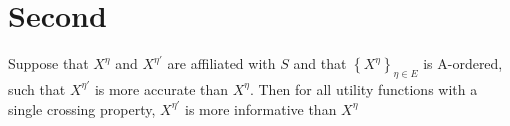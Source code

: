 \documentclass[a4paper]{article}
\begin{document}
 \begin{definition}
 \end{definition}

\section{Second}

 \begin{theorem}
 Suppose that \(X^{\eta}\) and \(X^{\eta'}\) are affiliated with \(S\) and that \(\left \{X^{\eta}\right \} _{\eta\in E}\) is A-ordered, such that \(X^{\eta'}\) is more accurate than \(X^{\eta}\). Then for all utility functions with a single crossing property, \(X^{\eta'}\) is more informative than \(X^{\eta}\)
 \end{theorem}

 \begin{definition}
 \end{definition}
\end{document}
